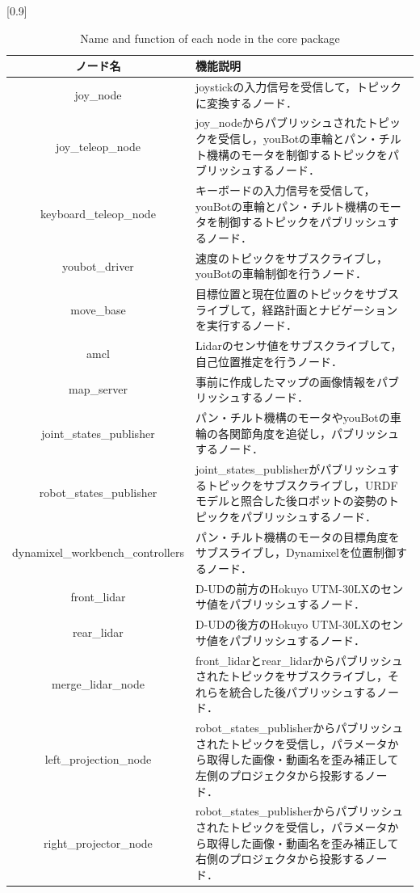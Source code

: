 \documentclass[12pt]{sonota/aislab}
\begin{document}
\begin{table}[t]
\begin{center}
\caption{Name and function of each node in the core package}
\label{table:ros_node}
\scalebox{0.9}[0.9]{
  \begin{tabular}{|c|p{8cm}|}\hline
   ノード名 & 機能説明 \\\hline
   joy\_node & joystickの入力信号を受信して，トピックに変換するノード． \\ \hline
   joy\_teleop\_node & joy\_nodeからパブリッシュされたトピックを受信し，youBotの車輪とパン・チルト機構のモータを制御するトピックをパブリッシュするノード． \\ \hline
   keyboard\_teleop\_node & キーボードの入力信号を受信して，youBotの車輪とパン・チルト機構のモータを制御するトピックをパブリッシュするノード． \\ \hline
   youbot\_driver & 速度のトピックをサブスクライブし，youBotの車輪制御を行うノード． \\ \hline
   move\_base & 目標位置と現在位置のトピックをサブスライブして，経路計画とナビゲーションを実行するノード． \\ \hline
   amcl & Lidarのセンサ値をサブスクライブして，自己位置推定を行うノード． \\ \hline
   map\_server & 事前に作成したマップの画像情報をパブリッシュするノード． \\ \hline
   joint\_states\_publisher & パン・チルト機構のモータやyouBotの車輪の各関節角度を追従し，パブリッシュするノード． \\ \hline
   robot\_states\_publisher & joint\_states\_publisherがパブリッシュするトピックをサブスクライブし，URDFモデルと照合した後ロボットの姿勢のトピックをパブリッシュするノード． \\ \hline
   dynamixel\_workbench\_controllers & パン・チルト機構のモータの目標角度をサブスライブし，Dynamixelを位置制御するノード． \\ \hline
   front\_lidar & D-UDの前方のHokuyo UTM-30LXのセンサ値をパブリッシュするノード． \\ \hline
   rear\_lidar & D-UDの後方のHokuyo UTM-30LXのセンサ値をパブリッシュするノード． \\ \hline
   merge\_lidar\_node & front\_lidarとrear\_lidarからパブリッシュされたトピックをサブスクライブし，それらを統合した後パブリッシュするノード． \\ \hline
   left\_projection\_node & robot\_states\_publisherからパブリッシュされたトピックを受信し，パラメータから取得した画像・動画名を歪み補正して左側のプロジェクタから投影するノード． \\ \hline
   right\_projector\_node & robot\_states\_publisherからパブリッシュされたトピックを受信し，パラメータから取得した画像・動画名を歪み補正して右側のプロジェクタから投影するノード． \\ \hline

  \end{tabular}
}
  \end{center}
\end{table}
\end{document}
